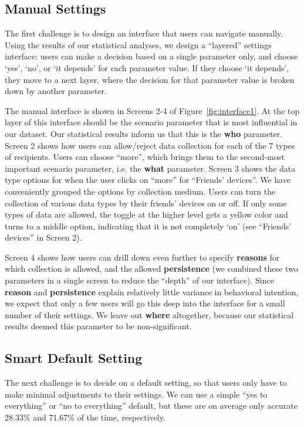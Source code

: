 \subsection{Manual Settings}
The first challenge is to design an interface that users can navigate manually. Using the results of our statistical analyses, we design a ``layered'' settings interface: users can make a decision based on a single parameter only, and choose `yes', `no', or `it depends' for each parameter value. If they choose `it depends', they move to a next layer, where the decision for that parameter value is broken down by another parameter. 


The manual interface is shown in Screens 2-4 of Figure~\ref{fig:interface1}. At the top layer of this interface should be the scenario parameter that is most influential in our dataset. Our statistical results inform us that this is the \textbf{who} parameter. Screen 2 shows how users can allow/reject data collection for each of the 7 types of recipients. Users can choose ``more'', which brings them to the second-most important scenario parameter, i.e. the \textbf{what} parameter. Screen 3 shows the data type options for when the user clicks on ``more'' for ``Friends' devices''. We have conveniently grouped the options by collection medium. Users can turn the collection of various data types by their friends' devices on or off. If only some types of data are allowed, the toggle at the higher level gets a yellow color and turns to a middle option, indicating that it is not completely `on' (see ``Friends' devices'' in Screen 2).


Screen 4 shows how users can drill down even further to specify \textbf{reasons} for which collection is allowed, and the allowed \textbf{persistence} (we combined these two parameters in a single screen to reduce the ``depth'' of our interface). Since \textbf{reason} and \textbf{persistence} explain relatively little variance in behavioral intention, we expect that only a few users will go this deep into the interface for a small number of their settings. We leave out \textbf{where} altogether, because our statistical results deemed this parameter to be non-significant.

\subsection{Smart Default Setting}
The next challenge is to decide on a default setting, so that users only have to make minimal adjustments to their settings. We can use a simple ``yes to everything'' or ``no to everything'' default, but these are on average only accurate 28.33\% and 71.67\% of the time, respectively. 

